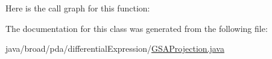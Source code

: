 Here is the call graph for this function\+:




The documentation for this class was generated from the following file\+:\begin{DoxyCompactItemize}
\item 
java/broad/pda/differential\+Expression/\hyperlink{_g_s_a_projection_8java}{G\+S\+A\+Projection.\+java}\end{DoxyCompactItemize}
